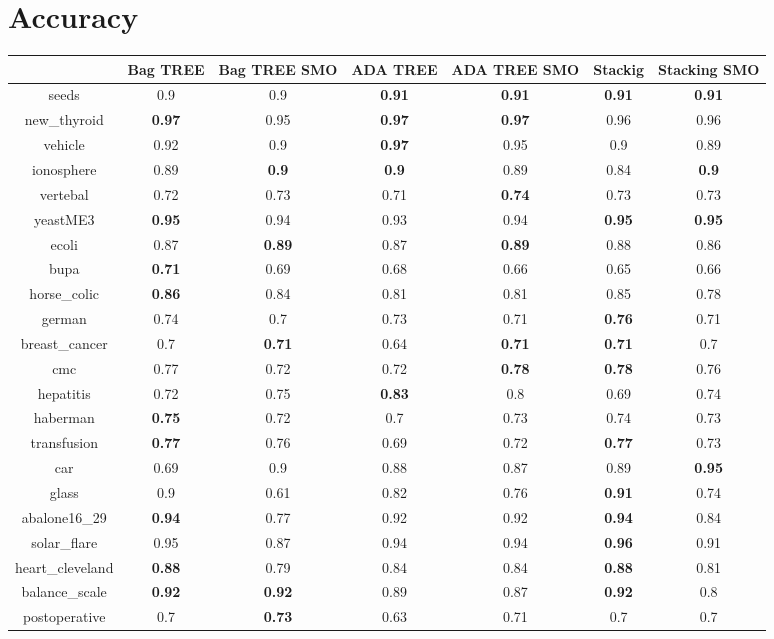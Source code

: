 \documentclass{article}%
\begin{document}
%
\normalsize%
\section*{Accuracy}%
\begin{tabular}{c|cccccc}%
&Bag TREE&Bag TREE SMO&ADA TREE&ADA TREE SMO&Stackig&Stacking SMO\\%
\hline%
seeds&0.9&0.9&\textbf{0.91}&\textbf{0.91}&\textbf{0.91}&\textbf{0.91}\\%
new\_thyroid&\textbf{0.97}&0.95&\textbf{0.97}&\textbf{0.97}&0.96&0.96\\%
vehicle&0.92&0.9&\textbf{0.97}&0.95&0.9&0.89\\%
ionosphere&0.89&\textbf{0.9}&\textbf{0.9}&0.89&0.84&\textbf{0.9}\\%
vertebal&0.72&0.73&0.71&\textbf{0.74}&0.73&0.73\\%
yeastME3&\textbf{0.95}&0.94&0.93&0.94&\textbf{0.95}&\textbf{0.95}\\%
ecoli&0.87&\textbf{0.89}&0.87&\textbf{0.89}&0.88&0.86\\%
bupa&\textbf{0.71}&0.69&0.68&0.66&0.65&0.66\\%
horse\_colic&\textbf{0.86}&0.84&0.81&0.81&0.85&0.78\\%
german&0.74&0.7&0.73&0.71&\textbf{0.76}&0.71\\%
breast\_cancer&0.7&\textbf{0.71}&0.64&\textbf{0.71}&\textbf{0.71}&0.7\\%
cmc&0.77&0.72&0.72&\textbf{0.78}&\textbf{0.78}&0.76\\%
hepatitis&0.72&0.75&\textbf{0.83}&0.8&0.69&0.74\\%
haberman&\textbf{0.75}&0.72&0.7&0.73&0.74&0.73\\%
transfusion&\textbf{0.77}&0.76&0.69&0.72&\textbf{0.77}&0.73\\%
car&0.69&0.9&0.88&0.87&0.89&\textbf{0.95}\\%
glass&0.9&0.61&0.82&0.76&\textbf{0.91}&0.74\\%
abalone16\_29&\textbf{0.94}&0.77&0.92&0.92&\textbf{0.94}&0.84\\%
solar\_flare&0.95&0.87&0.94&0.94&\textbf{0.96}&0.91\\%
heart\_cleveland&\textbf{0.88}&0.79&0.84&0.84&\textbf{0.88}&0.81\\%
balance\_scale&\textbf{0.92}&\textbf{0.92}&0.89&0.87&\textbf{0.92}&0.8\\%
postoperative&0.7&\textbf{0.73}&0.63&0.71&0.7&0.7\\%
\end{tabular}
\end{document}
